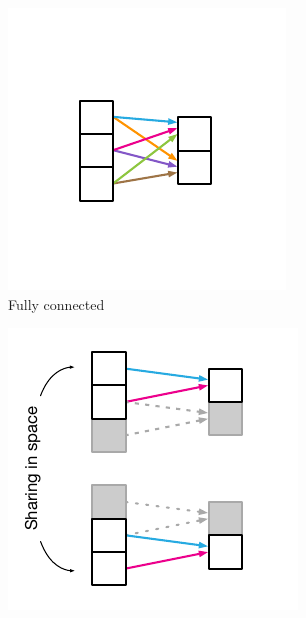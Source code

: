 \begin{figure}[t!]
\centering
\begin{subfigure}[b]{0.32\textwidth}
    \includegraphics[width=\textwidth]{figures/mlp}
    \caption{Fully connected}
\end{subfigure}
\begin{subfigure}[b]{0.32\textwidth}
    \includegraphics[width=\textwidth]{figures/cnn}

\end{subfigure}
\end{figure}

